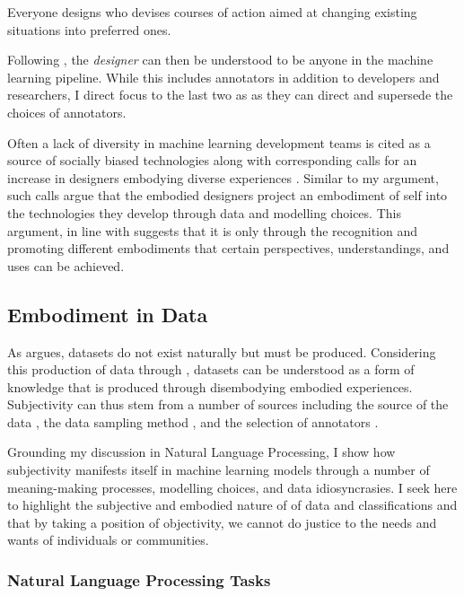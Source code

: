 \begin{citequote}{\citep[p. 111]{Simon:1969}}
  Everyone designs who devises courses of action aimed at changing existing situations into preferred ones.
\end{citequote}

Following \citet{Simon:1969}, the \textit{designer} can then be understood to be anyone in the machine learning pipeline. While this includes annotators in addition to developers and researchers, I direct focus to the last two as as they can direct and supersede the choices of annotators.

Often a lack of diversity in machine learning development teams is cited as a source of socially biased technologies along with corresponding calls for an increase in designers embodying diverse experiences \citep{West:2019}.
Similar to my argument, such calls argue that the embodied designers project an embodiment of self into the technologies they develop through data and modelling choices. This argument, in line with \citet{Haraway:1988} suggests that it is only through the recognition and promoting different embodiments that certain perspectives, understandings, and uses can be achieved.

\subsection{Embodiment in Data}
As \citet{Gitelman:2013} argues, datasets do not exist naturally but must be produced. Considering this production of data through \citet{Haraway:1988}, datasets can be understood as a form of knowledge that is produced through disembodying embodied experiences. Subjectivity can thus stem from a number of sources including the source of the data \citep{Gitelman-Jackson:2013}, the data sampling method \citep{Shah:2020}, and the selection of annotators \citep{Waseem:2016,Derczynski:2016}.

Grounding my discussion in Natural Language Processing, I show how subjectivity manifests itself in machine learning models through a number of meaning-making processes, modelling choices, and data idiosyncrasies. I seek here to highlight the subjective and embodied nature of of data and classifications and that by taking a position of objectivity, we cannot do justice to the needs and wants of individuals or communities.

\subsubsection{Natural Language Processing Tasks}

